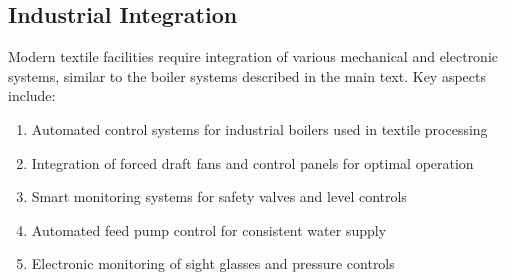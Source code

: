 \subsection{Industrial Integration}
Modern textile facilities require integration of various mechanical and electronic systems, similar to the boiler systems described in the main text. Key aspects include:
\begin{enumerate}
\item Automated control systems for industrial boilers used in textile processing
\item Integration of forced draft fans and control panels for optimal operation
\item Smart monitoring systems for safety valves and level controls
\item Automated feed pump control for consistent water supply
\item Electronic monitoring of sight glasses and pressure controls
\end{enumerate}
